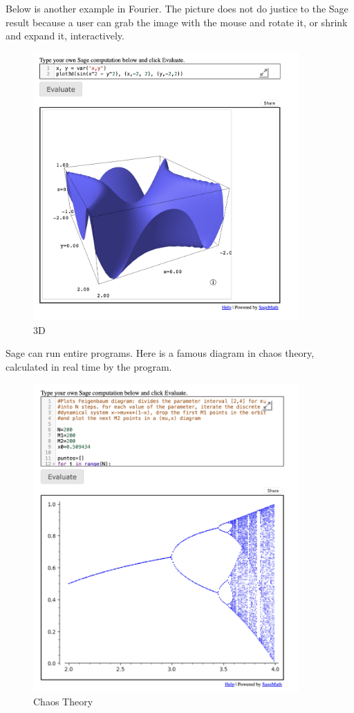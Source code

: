 \documentclass[11pt, oneside]{article}   	%
\begin{document}
 Below is another example in Fourier. The picture  does not do  justice
 to the Sage result because a user can grab the image with the mouse and rotate it, or shrink
 and expand it, interactively.
  
   \begin{figure}[htbp] %
     \centering
     \includegraphics[width=4in]{image2.png} 
     \caption{3D}
     \label{fig:example}
  \end{figure}
  \newpage
  
 Sage can run entire programs. Here is a famous diagram in chaos theory,
 calculated in real time by the program.
  
   \begin{figure}[htbp] %
     \centering
     \includegraphics[width=4in]{image3.png} 
     \caption{Chaos Theory}
     \label{fig:example}
  \end{figure}
  \newpage
  
\end{document}
